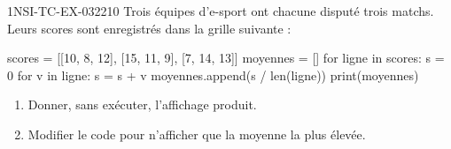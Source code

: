 \begin{exercice}{1NSI-TC-EX-032}{2}{10}
Trois équipes d'e-sport ont chacune disputé trois matchs. Leurs scores sont
enregistrés dans la grille suivante :
\begin{python}
scores = [[10, 8, 12],
           [15, 11, 9],
           [7, 14, 13]]
moyennes = []
for ligne in scores:
    s = 0
    for v in ligne:
        s = s + v
    moyennes.append(s / len(ligne))
print(moyennes)
\end{python}
\begin{enumerate}
  \item Donner, sans exécuter, l'affichage produit.
  \item Modifier le code pour n'afficher que la moyenne la plus élevée.
\end{enumerate}
\end{exercice}
